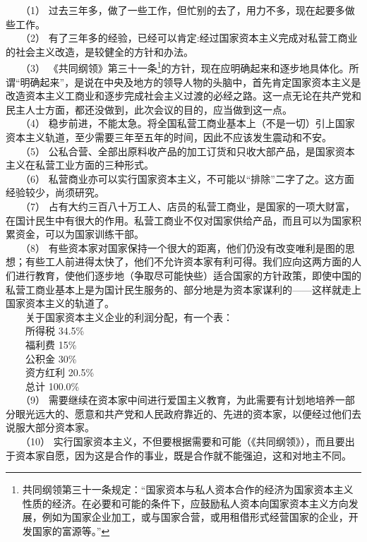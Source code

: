 \documentclass[cn,11pt,chinese]{elegantbook}
\begin{document}
　　（1） 过去三年多，做了一些工作，但忙别的去了，用力不多，现在起要多做些工作。\\
　　（2） 有了三年多的经验，已经可以肯定:经过国家资本主义完成对私营工商业的社会主义改造，是较健全的方针和办法。\\
　　（3） 《共同纲领》第三十一条\footnote[1]{ 共同纲领第三十一条规定：“国家资本与私人资本合作的经济为国家资本主义性质的经济。在必要和可能的条件下，应鼓励私人资本向国家资本主义方向发展，例如为国家企业加工，或与国家合营，或用租借形式经营国家的企业，开发国家的富源等。”}的方针，现在应明确起来和逐步地具体化。所谓“明确起来”，是说在中央及地方的领导人物的头脑中，首先肯定国家资本主义是改造资本主义工商业和逐步完成社会主义过渡的必经之路。这一点无论在共产党和民主人士方面，都还没做到，此次会议的目的，应当做到这一点。\\
　　（4） 稳步前进，不能太急。将全国私营工商业基本上（不是一切）引上国家资本主义轨道，至少需要三年至五年的时间，因此不应该发生震动和不安。\\
　　（5） 公私合营、全部出原料收产品的加工订货和只收大部产品，是国家资本主义在私营工业方面的三种形式。\\
　　（6） 私营商业亦可以实行国家资本主义，不可能以“排除”二字了之。这方面经验较少，尚须研究。\\
　　（7） 占有大约三百八十万工人、店员的私营工商业，是国家的一项大财富，在国计民生中有很大的作用。私营工商业不仅对国家供给产品，而且可以为国家积累资金，可以为国家训练干部。\\
　　（8） 有些资本家对国家保持一个很大的距离，他们仍没有改变唯利是图的思想；有些工人前进得太快了，他们不允许资本家有利可得。我们应向这两方面的人们进行教育，使他们逐步地（争取尽可能快些）适合国家的方针政策，即使中国的私营工商业基本上是为国计民生服务的、部分地是为资本家谋利的——这样就走上国家资本主义的轨道了。\\
　　关于国家资本主义企业的利润分配，有一个表：\\
　　所得税	34.5\%\\
　　福利费	15\%\\
　　公积金	30\%\\
　　资方红利	20.5\%\\
　　总计	100.0\%\\
　　（9） 需要继续在资本家中间进行爱国主义教育，为此需要有计划地培养一部分眼光远大的、愿意和共产党和人民政府靠近的、先进的资本家，以便经过他们去说服大部分资本家。\\
　　（10） 实行国家资本主义，不但要根据需要和可能（《共同纲领》），而且要出于资本家自愿，因为这是合作的事业，既是合作就不能强迫，这和对地主不同。\\
\end{document}
